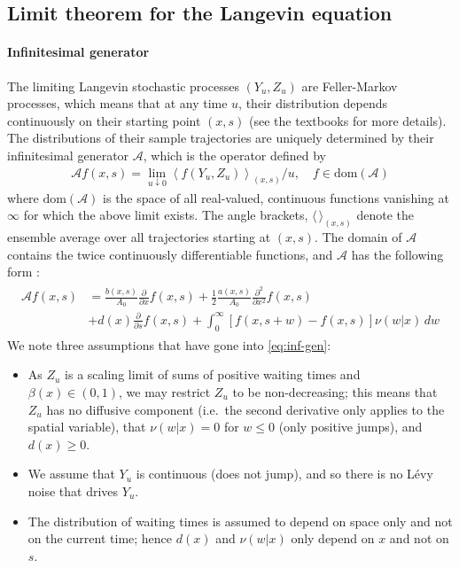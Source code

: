 \documentclass[a4paper,12pt]{elsarticle}
\numberwithin{equation}{section}
\theoremstyle{plain}
\theoremstyle{definition}
\theoremstyle{remark}
\numberwithin{equation}{section}
\newcommand{\1}{\mathbf 1}
\newcommand{\del}{\partial}
\begin{document}
\subsection{Limit theorem for the Langevin equation}
\label{subsec:convergence}
\paragraph{Infinitesimal generator}
The limiting Langevin stochastic processes $(Y_u,Z_u)$ are Feller-Markov
processes, which means that at any time $u$, their distribution depends 
continuously on their starting point $(x,s)$ (see the textbooks 
\cite{Kallenberg, Applebaum} for more details).
The distributions of their sample trajectories
are uniquely determined by their infinitesimal generator $\mathcal A$, 
which is the operator defined by 
\begin{align}
\mathcal A f(x,s) = \lim_{u \downarrow 0}
\left \langle f(Y_u, Z_u)\right \rangle_{(x,s)} / u, 
\quad f \in \text{dom}(\mathcal A)
\end{align}
where $\text{dom}(\mathcal A)$ is the space of all real-valued, 
continuous functions vanishing at $\infty$ for 
which the above limit exists.
The angle brackets, $\langle \, \rangle_{(x,s)}$ denote the ensemble average over all
trajectories starting at $(x,s)$. The domain of $\mathcal A$ contains the twice
continuously differentiable functions, and $\mathcal A$ has the following
form \cite[Section 6.7.1]{Applebaum}:
\begin{align} \label{eq:inf-gen}
\begin{split}
\mathcal A f(x,s)
&= \frac{b(x,s)}{A_0} \frac{\del }{\del x} f(x,s)
+\frac{1}{2} \frac{a(x,s)}{A_0} \frac{\del^2}{\del x^2} f(x,s)\\
&+ d(x) \frac{\partial}{\partial s} f(x,s)
+ \int_0^\infty \left[f(x,s+w)-f(x,s)
\right] \nu(w|x)\, dw
\end{split}
\end{align}
We note three assumptions that have gone into \eqref{eq:inf-gen}: 
\begin{itemize}
\item
As $Z_u$ is a scaling limit of sums of positive waiting times and 
$\beta(x) \in (0,1)$,
we may restrict $Z_u$ to be non-decreasing; this means that
$Z_u$ has no diffusive component (i.e.\ the second derivative only applies to 
the spatial variable), that $\nu(w|x) = 0$ for $w \le 0$
(only positive jumps), and $d(x) \ge 0$.
\item
We assume that $Y_u$ is continuous (does not jump),
and so there is no L\'evy noise that drives $Y_u$.
\item
The distribution of waiting times is assumed to depend on space only and not
on the current time; hence $d(x)$ and $\nu(w|x)$ only depend on $x$ and not on $s$.
\end{itemize}
\end{document}
